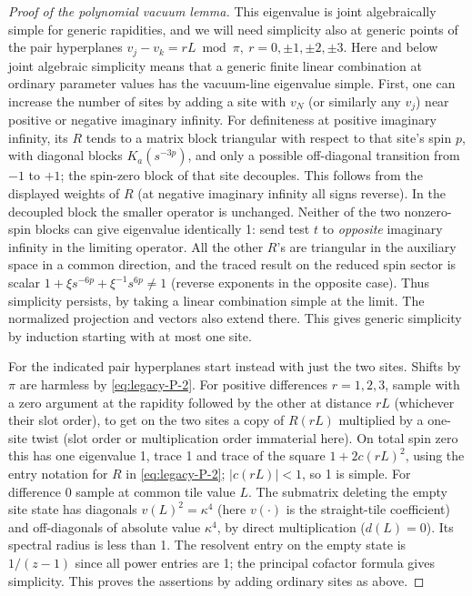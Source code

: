 \begin{proof}[Proof of the polynomial vacuum lemma]
This eigenvalue is joint algebraically simple for generic rapidities, and we will need simplicity also at generic points of the pair hyperplanes \(v_j-v_k=rL\bmod\pi,\ r=0,\pm1,\pm2,\pm3\). Here and below joint algebraic simplicity means that a generic finite linear combination at ordinary parameter values has the vacuum-line eigenvalue simple. First, one can increase the number of sites by adding a site with \(v_N\) (or similarly any \(v_j\)) near positive or negative imaginary infinity. For definiteness at positive imaginary infinity, its \(R\) tends to a matrix block triangular with respect to that site's spin \(p\), with diagonal blocks \(K_a(s^{-3p})\), and only a possible off-diagonal transition from \(-1\) to \(+1\); the spin-zero block of that site decouples. This follows from the displayed weights of \(R\) (at negative imaginary infinity all signs reverse). In the decoupled block the smaller operator is unchanged. Neither of the two nonzero-spin blocks can give eigenvalue identically 1: send test \(t\) to \emph{opposite} imaginary infinity in the limiting operator. All the other \(R\)'s are triangular in the auxiliary space in a common direction, and the traced result on the reduced spin sector is scalar \(1+\xi s^{-6p}+\xi^{-1}s^{6p}\ne1\) (reverse exponents in the opposite case). Thus simplicity persists, by taking a linear combination simple at the limit. The normalized projection and vectors also extend there. This gives generic simplicity by induction starting with at most one site.

For the indicated pair hyperplanes start instead with just the two sites. Shifts by \(\pi\) are harmless by \eqref{eq:legacy-P-2}. For positive differences \(r=1,2,3\), sample with a zero argument at the rapidity followed by the other at distance \(rL\) (whichever their slot order), to get on the two sites a copy of \(R(rL)\) multiplied by a one-site twist (slot order or multiplication order immaterial here). On total spin zero this has one eigenvalue 1, trace 1 and trace of the square \(1+2c(rL)^2\), using the entry notation for \(R\) in \eqref{eq:legacy-P-2}; \(|c(rL)|<1\), so 1 is simple. For difference 0 sample at common tile value \(L\). The submatrix deleting the empty site state has diagonals \(v(L)^2=\kappa^4\) (here \(v(\cdot)\) is the straight-tile coefficient) and off-diagonals of absolute value \(\kappa^4\), by direct multiplication (\(d(L)=0\)). Its spectral radius is less than 1. The resolvent entry on the empty state is \(1/(z-1)\) since all power entries are 1; the principal cofactor formula gives simplicity. This proves the assertions by adding ordinary sites as above.


\end{proof}
